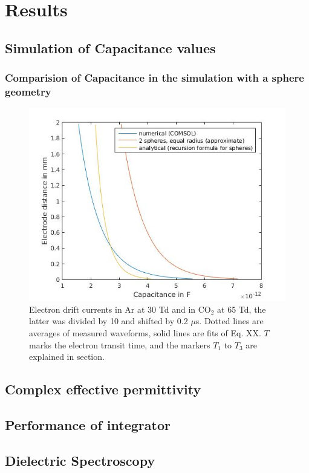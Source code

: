 \chapter{Results}
\section{Simulation of Capacitance values}
\subsection{Comparision of Capacitance in the simulation with a sphere geometry}

\begin{figure}[htbp]
	\centering
	\includegraphics[scale=0.3]{figures/Capacitance_comparision.jpg}		
	\caption[Kurze Abbildungsbeschreibung]{Electron drift currents in Ar at 30 Td and in CO$_2$ at 65 Td, the latter was divided by 10 and shifted by 0.2 $\mu$s. Dotted lines are averages of measured waveforms, solid lines are fits of Eq. XX. $T$ marks the electron transit time, and the markers $T_1$ to $T_3$ are explained in section.} %
	\label{fig.waveforms}
\end{figure}

\section{Complex effective permittivity}
\subsection{}

\section{Performance of integrator}

\section{Dielectric Spectroscopy}

\begin{figure}[htbp]
\end{figure}
